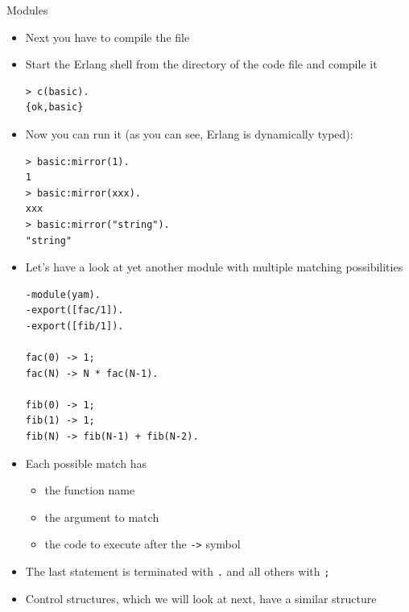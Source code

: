\documentclass[12pt,xcolor=svgnames]{beamer}
\begin{document}
\begin{frame}{Modules}
\framebreak

\begin{itemize}
\item Next you have to compile the file
\item Start the Erlang shell from the directory of the code file and compile it
\begin{Verbatim}
> c(basic).
{ok,basic}
\end{Verbatim}
\item Now you can run it (as you can see, Erlang is dynamically typed):
\begin{Verbatim}
> basic:mirror(1).
1
> basic:mirror(xxx).
xxx
> basic:mirror("string").
"string"
\end{Verbatim}
\end{itemize}

\framebreak

\begin{itemize}
\item Let's have a look at yet another module with multiple matching possibilities
\begin{Verbatim}
-module(yam).
-export([fac/1]).
-export([fib/1]).

fac(0) -> 1;
fac(N) -> N * fac(N-1).

fib(0) -> 1;
fib(1) -> 1;
fib(N) -> fib(N-1) + fib(N-2).
\end{Verbatim}
\end{itemize}

\framebreak

\begin{itemize}
\item Each possible match has
\begin{itemize}
\item the function name
\item the argument to match
\item the code to execute after the \texttt{->} symbol
\end{itemize}
\item The last statement is terminated with \texttt{.} and all others with \texttt{;}
\item Control structures, which we will look at next, have a similar structure
\end{itemize}
\end{frame}
\end{document}
